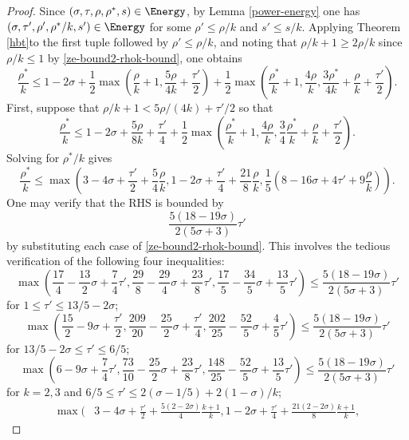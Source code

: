 \begin{proof}
Since $(\sigma, \tau, \rho, \rho^*, s) \in \Energy$, by Lemma \ref{power-energy} one has $(\sigma, \tau', \rho', \rho^*/k, s') \in \Energy$ for some $\rho' \le \rho/k$ and $s'\le s/k$. Applying Theorem \eqref{hbt}to the first tuple followed by $\rho' \le \rho/k$, and noting that $\rho/k + 1 \ge 2\rho/k$ since $\rho/k \le 1$ by \eqref{ze-bound2-rhok-bound}, one obtains
\begin{equation}\label{ze-bound2-rhostar-boundk}
\frac{\rho^*}{k} \le 1-2\sigma + \frac{1}{2}\max\left(\frac{\rho}{k}+1, \frac{5\rho}{4k} + \frac{\tau'}{2}\right) + \frac{1}{2}\max\left(\frac{\rho^*}{k}+1, \frac{4\rho}{k}, \frac{3\rho^*}{4k} +\frac{\rho}{k}+\frac{\tau'}{2}\right).
\end{equation}
First, suppose that $\rho/k  + 1 < 5\rho/(4k) + \tau'/2$ so that
\[
\frac{\rho^*}{k} \leq 1-2\sigma + \frac{5\rho}{8k} + \frac{\tau'}{4} + \frac{1}{2}\max\left(\frac{\rho^*}{k}+1, \frac{4\rho}{k}, \frac{3}{4}\frac{\rho^*}{k} + \frac{\rho}{k}+\frac{\tau'}{2}\right).
\]
Solving for $\rho^*/k$ gives
\[
\frac{\rho^*}{k} \le \max\left(3 - 4\sigma + \frac{\tau'}{2} + \frac{5}{4}\frac{\rho}{k}, 1 - 2\sigma + \frac{\tau'}{4} + \frac{21}{8}\frac{\rho}{k}, \frac{1}{5}(8 - 16\sigma + 4\tau' + 9\frac{\rho}{k})\right).
\]
One may verify that the RHS is bounded by
\[
\frac{5(18 - 19\sigma)}{2(5\sigma + 3)}\tau'
\]
by substituting each case of \eqref{ze-bound2-rhok-bound}. This involves the tedious verification of the following four inequalities:
\begin{equation}\label{ze-bound2-rho-case1-1}
\max\left(\frac{17}{4} - \frac{13}{2}\sigma + \frac{7}{4}\tau', \frac{29}{8} - \frac{29}{4}\sigma + \frac{23}{8}\tau', \frac{17}{5} - \frac{34}{5}\sigma + \frac{13}{5}\tau'\right) \le \frac{5(18 - 19\sigma)}{2(5\sigma + 3)}\tau'
\end{equation}
for $1 \le \tau' \le 13/5 - 2\sigma$;
\[
\max\left(\frac{15}{2} - 9\sigma + \frac{\tau'}{2}, \frac{209}{20} - \frac{25}{2}\sigma + \frac{\tau'}{4}, \frac{202}{25} - \frac{52}{5}\sigma + \frac{4}{5}\tau'\right) \le \frac{5(18 - 19\sigma)}{2(5\sigma + 3)}\tau'
\]
for $13/5 - 2\sigma \le \tau' \le 6/5$;
\[
\max\left(6 - 9\sigma + \frac{7}{4}\tau', \frac{73}{10} - \frac{25}{2}\sigma + \frac{23}{8}\tau', \frac{148}{25} - \frac{52}{5}\sigma + \frac{13}{5}\tau'\right) \le \frac{5(18 - 19\sigma)}{2(5\sigma + 3)}\tau'
\]
for $k = 2, 3$ and $6/5 \le \tau' \le 2(\sigma - 1/5) + 2(1-\sigma)/k$;
\begin{equation*}
\begin{split}
\max(&3 - 4\sigma + \frac{\tau'}{2} + \frac{5(2 - 2\sigma)}{4}\frac{k + 1}{k}, 1 - 2\sigma + \frac{\tau'}{4} + \frac{21(2 - 2\sigma)}{8}\frac{k + 1}{k},

\end{split}
\end{equation*}
\end{proof}
